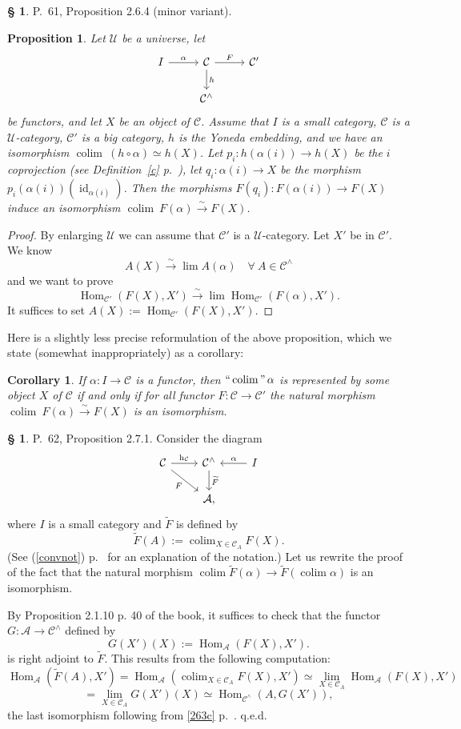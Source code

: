 \documentclass[12pt]{article}
\newtheorem{prop}[thm]{Proposition}
\newtheorem{cor}[thm]{Corollary}
\theoremstyle{remark}
\theoremstyle{definition}
\newtheorem{s}[thm]{\S}
\newcommand{\A}{\mathcal A}
\newcommand{\C}{\mathcal C}
\newcommand{\U}{\mathcal U}
\newcommand{\mv}{ (minor variant)}
\newcommand{\cn}{(See (\ref{convnot}) p.~\pageref{convnot} for an explanation of the notation.) }%
\DeclareMathOperator*{\coli}{colim}
\DeclareMathOperator*{\co}{colim}
\DeclareMathOperator*{\ic}{``\coli"}
\DeclareMathOperator{\hy}{h}
\DeclareMathOperator{\id}{id}
\DeclareMathOperator{\Hom}{Hom}%
\begin{document}
\begin{s} 
P.~61, Proposition 2.6.4\mv.
%
\begin{prop}\label{264}
Let $\U$ be a universe, let 
$$
\begin{tikzcd}
I\ar{r}{\alpha}&\C\ar{d}{h}\ar{r}{F}&\C'\\
&\C^\wedge
\end{tikzcd}
$$ 
be functors, and let $X$ be an object of $\C$. Assume that $I$ is a small category, $\C$ is a $\U$-category, $\C'$ is a big category, $h$ is the Yoneda embedding, and we have an isomorphism $\co\ (h\circ\alpha)\simeq h(X)$. Let $p_i:h(\alpha(i))\to h(X)$ be the $i$ coprojection (see Definition~\ref{c} p.~\pageref{c}), let $q_i:\alpha(i)\to X$ be the morphism $p_i(\alpha(i))(\id_{\alpha(i)})$. Then the morphisms $F(q_i):F(\alpha(i))\to F(X)$ induce an isomorphism $\co\ F(\alpha)\xrightarrow\sim F(X)$.
\end{prop}
%
\begin{proof}
By enlarging $\U$ we can assume that $\C'$ is a $\U$-category. Let $X'$ be in $\C'$. We know 
$$
A(X)\xrightarrow\sim\lim A(\alpha)\quad\forall\ A\in\C^\wedge 
$$ 
and we want to prove 
$$
\Hom_{\C'}(F(X),X')\xrightarrow\sim\lim\Hom_{\C'}(F(\alpha),X'). 
$$ 
It suffices to set $A(X):=\Hom_{\C'}(F(X),X')$.
\end{proof}

Here is a slightly less precise reformulation of the above proposition, which we state (somewhat inappropriately) as a corollary:
\begin{cor}\label{264b}
If $\alpha:I\to\C$ is a functor, then $\ic\alpha$ is represented by some object $X$ of $\C$ if and only if for all functor $F:\C\to\C'$ the natural morphism $\co\ F(\alpha)\xrightarrow\sim F(X)$ is an isomorphism.
\end{cor}
\end{s}
%
%
\begin{s}\label{c271b}
P.~62, Proposition 2.7.1. Consider the diagram 
$$
\begin{tikzcd}
\C\ar{r}{\hy_\C}\ar{dr}[swap]{F}&\C^\wedge\ar{d}{\widetilde F}&I\ar{l}[swap]{\alpha}\\
&\A,
\end{tikzcd}
$$
where $I$ is a small category and $\widetilde F$ is defined by 
$$
\widetilde F(A):=\coli_{X\in\C_A}F(X). 
$$
\cn Let us rewrite the proof of the fact that the natural morphism $\coli\widetilde F(\alpha)\to\widetilde F\left(\coli\alpha\right)$ is an isomorphism. 

By Proposition 2.1.10 p. 40 of the book, it suffices to check that the functor $G:\A\to\C^\wedge$ defined by 
$$
G(X')(X):=\Hom_{\A}(F(X),X').
$$ 
is right adjoint to $\widetilde F$. This results from the following computation: 
$$
\Hom_{\A}\left(\widetilde F(A),X'\right)=
\Hom_{\A}\left(\coli_{X\in\C_A}F(X),X'\right)\simeq 
\lim_{X\in\C_A}\Hom_{\A}(F(X),X')
$$
$$
=\lim_{X\in\C_A}G(X')(X)\simeq\Hom_{\C^\wedge}(A,G(X')), 
$$ 
the last isomorphism following from \eqref{263c} p.~\pageref{263c}. q.e.d.
\end{s}
\end{document}
